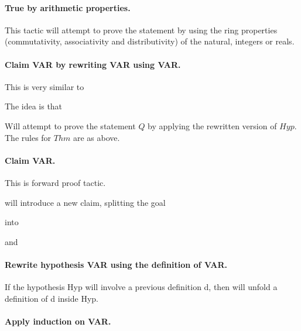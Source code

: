 \paragraph{\bf True by arithmetic properties.}

This tactic will attempt to prove the statement by using the ring properties (commutativity, associativity and distributivity) of the natural, integers or reals. 

\paragraph{\bf Claim VAR by rewriting VAR using VAR.}

This is very similar to 

The idea is that 

Will attempt to prove the statement $Q$ by applying the rewritten version of $Hyp$. The rules for $Thm$ are as above.

\paragraph{\bf Claim VAR.}

This is forward proof tactic. 

will introduce a new claim, splitting the goal


into 

and 






\paragraph{\bf Rewrite hypothesis VAR using the definition of VAR.}
If the hypothesis Hyp will involve a previous definition d, then
 will unfold a definition of d inside Hyp.

\paragraph{\bf Apply induction on VAR.}

